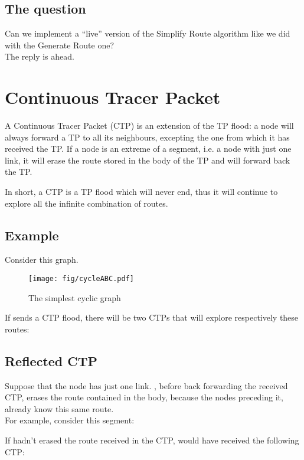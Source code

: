 \documentclass[a4paper]{article}
\begin{document}
\subsection{The question}

Can we implement a ``live'' version of the Simplify Route algorithm like we
did with the Generate Route one?\\
The reply is ahead.

\newpage
\section{Continuous Tracer Packet}
\label{sec:CTP}

A Continuous Tracer Packet (CTP) is an extension of the TP flood: a node will
always forward a TP to all its neighbours, excepting the one from which it has
received the TP.
If a node is an extreme of a segment, i.e. a node with just one link, it will
erase the route stored in the body of the TP and will forward back the TP.

In short, a CTP is a TP flood which will never end, thus it will continue to
explore all the infinite combination of routes. 

\subsection*{Example}
Consider this graph.
\begin{figure}[h]
	\begin{center}
		\texttt{[image: fig/cycleABC.pdf]}
	\end{center}
	\caption{The simplest cyclic graph}
	\label{fig:cycleABC}
\end{figure}
If  sends a CTP flood, there will be two CTPs that will explore
respectively these routes:



\subsection{Reflected CTP}
\label{sec:reflected_CTP}

Suppose that the node  has just one link.
, before back forwarding the received CTP, erases the route contained in
the body, because the nodes preceding it, already know this same route.
\\
For example, consider this segment:

If  hadn't erased the route received in the CTP,  would have received
the following CTP:
\end{document}
